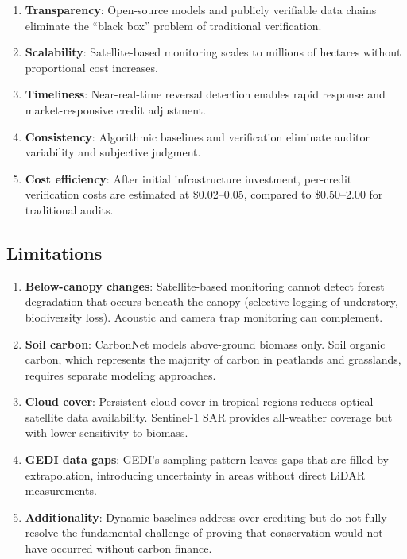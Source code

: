 \documentclass[11pt,a4paper]{article}
\begin{document}
\begin{enumerate}
  \item \textbf{Transparency}: Open-source models and publicly
    verifiable data chains eliminate the ``black box'' problem of
    traditional verification.
  \item \textbf{Scalability}: Satellite-based monitoring scales to
    millions of hectares without proportional cost increases.
  \item \textbf{Timeliness}: Near-real-time reversal detection enables
    rapid response and market-responsive credit adjustment.
  \item \textbf{Consistency}: Algorithmic baselines and verification
    eliminate auditor variability and subjective judgment.
  \item \textbf{Cost efficiency}: After initial infrastructure
    investment, per-credit verification costs are estimated at
    \$0.02--0.05, compared to \$0.50--2.00 for traditional audits.
\end{enumerate}

\subsection{Limitations}

\begin{enumerate}
  \item \textbf{Below-canopy changes}: Satellite-based monitoring
    cannot detect forest degradation that occurs beneath the canopy
    (selective logging of understory, biodiversity loss). Acoustic and
    camera trap monitoring can complement.
  \item \textbf{Soil carbon}: CarbonNet models above-ground biomass
    only. Soil organic carbon, which represents the majority of carbon
    in peatlands and grasslands, requires separate modeling approaches.
  \item \textbf{Cloud cover}: Persistent cloud cover in tropical regions
    reduces optical satellite data availability. Sentinel-1 SAR provides
    all-weather coverage but with lower sensitivity to biomass.
  \item \textbf{GEDI data gaps}: GEDI's sampling pattern leaves gaps
    that are filled by extrapolation, introducing uncertainty in areas
    without direct LiDAR measurements.
  \item \textbf{Additionality}: Dynamic baselines address over-crediting
    but do not fully resolve the fundamental challenge of proving that
    conservation would not have occurred without carbon finance.
\end{enumerate}
\end{document}
